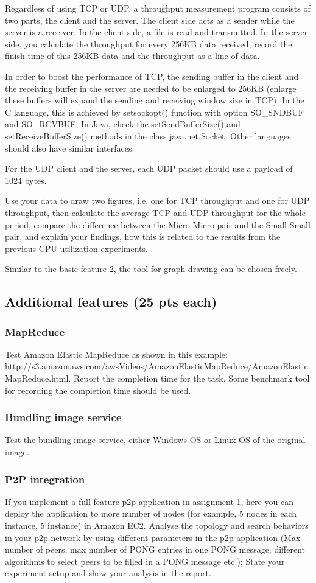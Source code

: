 \documentclass[12pt, a4paper]{article}
\begin{document}
Regardless of using TCP or UDP, a throughput measurement program consists of two parts, the client and the server. The client side acts as a sender while the server is a receiver. In the client side, a file is read and transmitted. In the server side, you calculate the throughput for every 256KB data received, record the finish time of this 256KB data and the throughput as a line of data.

In order to boost the performance of TCP, the sending buffer in the client and the receiving buffer in the server are needed to be enlarged to 256KB (enlarge these buffers will expand the sending and receiving window size in TCP). In the C language, this is achieved by setsockopt() function with option SO\_SNDBUF and SO\_RCVBUF; In Java, check the setSendBufferSize() and setReceiveBufferSize() methods in the class java.net.Socket. Other languages should also have similar interfaces.

For the UDP client and the server, each UDP packet should use a payload of 1024 bytes.

Use your data to draw two figures, i.e. one for TCP throughput and one for UDP throughput, then calculate the average TCP and UDP throughput for the whole period, compare the difference between the  Micro-Micro pair and the Small-Small pair, and explain your findings, how this is related to the results from the previous CPU utilization experiments.

Similar to the basic feature 2, the tool for graph drawing can be chosen freely.
\subsection{Additional features (25 pts each)}
\subsubsection{MapReduce}
Test Amazon Elastic MapReduce as shown in this example: http://s3.amazonaws.com/awsVideos/AmazonElasticMapReduce/AmazonElasticMapReduce.html. Report the completion time for the task. Some benchmark tool for recording the completion time should be used.
\subsubsection{Bundling image service}
Test the bundling image service, either Windows OS or Linux OS of the original image.
\subsubsection{P2P integration}
If you implement a full feature p2p application in assignment 1, here you can deploy the application to more number of nodes (for example, 5 nodes in each instance, 5 instance) in Amazon EC2. Analyse the topology and search behaviors in your p2p network by using different parameters in the p2p application (Max number of peers, max number of PONG entries in one PONG message, different algorithms to select peers to be filled in a PONG message etc.); State your experiment setup and show your analysis in the report.
\end{document}
